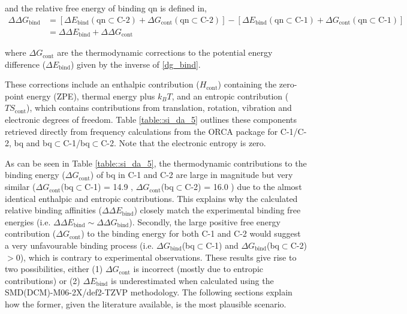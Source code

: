 \documentclass[../../main.tex]{subfiles}
\begin{document}
and the relative free energy of binding qn is defined in,
\begin{equation}
	\begin{aligned}
		\Delta\Delta G_\text{bind} &= [\Delta E_\text{bind} (\text{qn}\subset\text{C-2}) + \Delta G_\text{cont} (\text{qn}\subset\text{C-2})] - [\Delta E_\text{bind} (\text{qn}\subset\text{C-1})  + \Delta G_\text{cont} (\text{qn}\subset\text{C-1})] \\
		&= \Delta\Delta E_\text{bind}  + \Delta\Delta G_\text{cont}
	\end{aligned}	
\end{equation}

where $\Delta G_\text{cont}$ are the thermodynamic corrections to the potential energy difference ($\Delta E_\text{bind}$) given by the inverse of \eqref{dg_bind}.

These corrections include an enthalpic contribution ($H_\text{cont}$) containing the zero-point energy (ZPE), thermal energy plus $k_BT$, and an entropic contribution ($TS_\text{cont}$), which contains contributions from translation, rotation, vibration and electronic degrees of freedom. Table \ref{table::si_da_5} outlines these components retrieved directly from frequency calculations from the ORCA package for C-1/C-2, bq and bq$\subset$C-1/bq$\subset$C-2. Note that the electronic entropy is zero.

As can be seen in Table \ref{table::si_da_5}, the thermodynamic contributions to the binding energy ($\Delta G_\text{cont}$) of bq in C-1 and C-2 are large in magnitude but very similar ($\Delta G_\text{cont}$(bq$\subset$C-1) = 14.9 \kcal, $\Delta G_\text{cont}$(bq$\subset$C-2) = 16.0 \kcal) due to the almost identical enthalpic and entropic contributions. This explains why the calculated relative binding affinities ($\Delta\Delta E_\text{bind}$) closely match the experimental binding free energies (i.e. $\Delta\Delta E_\text{bind} \sim \Delta\Delta G_\text{bind}$). Secondly, the large positive free energy contribution ($\Delta G_\text{cont}$) to the binding energy for both C-1 and C-2 would suggest a very unfavourable binding process (i.e. $\Delta G_\text{bind}$(bq$\subset$C-1) and $\Delta G_\text{bind}$(bq$\subset$C-2) $> 0$), which is contrary to experimental observations. These results give rise to two possibilities, either (1) $\Delta G_\text{cont}$ is incorrect (mostly due to entropic contributions) or (2) $\Delta E_\text{bind}$ is underestimated when calculated using the SMD(DCM)-M06-2X/def2-TZVP methodology. The following sections explain how the former, given the literature available, is the most plausible scenario.
\end{document}
